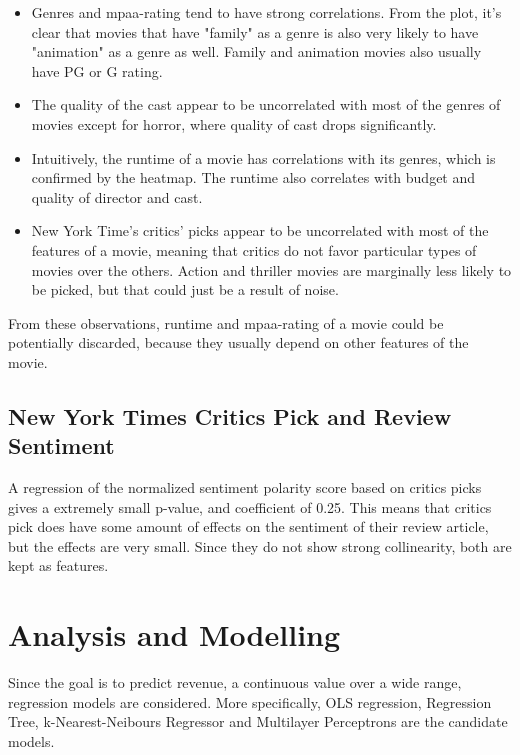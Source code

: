 \documentclass[11pt]{article}
\begin{document}
\begin{itemize}
\item
  Genres and mpaa-rating tend to have strong correlations. From the
  plot, it's clear that movies that have "family" as a genre is also
  very likely to have "animation" as a genre as well. Family and
  animation movies also usually have PG or G rating.
\item
  The quality of the cast appear to be uncorrelated with most of the
  genres of movies except for horror, where quality of cast drops
  significantly.
\item
  Intuitively, the runtime of a movie has correlations with its genres,
  which is confirmed by the heatmap. The runtime also correlates with
  budget and quality of director and cast.
\item
  New York Time's critics' picks appear to be uncorrelated with most of
  the features of a movie, meaning that critics do not favor particular
  types of movies over the others. Action and thriller movies are
  marginally less likely to be picked, but that could just be a result
  of noise.
\end{itemize}

From these observations, runtime and mpaa-rating of a movie could be
potentially discarded, because they usually depend on other features of
the movie.

\subsection{New York Times Critics Pick and Review
Sentiment}\label{new-york-times-critics-pick-and-review-sentiment}

A regression of the normalized sentiment polarity score based on critics
picks gives a extremely small p-value, and coefficient of 0.25. This
means that critics pick does have some amount of effects on the
sentiment of their review article, but the effects are very small. Since
they do not show strong collinearity, both are kept as features.

    \section{Analysis and Modelling}\label{analysis-and-modelling}

Since the goal is to predict revenue, a continuous value over a wide
range, regression models are considered. More specifically, OLS
regression, Regression Tree, k-Nearest-Neibours Regressor and Multilayer
Perceptrons are the candidate models.
\end{document}
